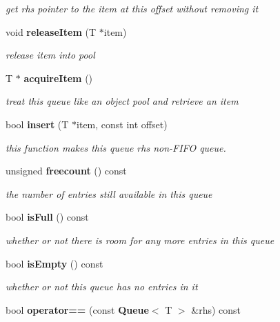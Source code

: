 \begin{CompactItemize}
\begin{CompactList}\small\item\em get rhs pointer to the item at this offset without removing it \item\end{CompactList}\item 
void {\bf releaseItem} (T $\ast$item)
\begin{CompactList}\small\item\em release item into pool \item\end{CompactList}\item 
T $\ast$ {\bf acquireItem} ()
\begin{CompactList}\small\item\em treat this queue like an object pool and retrieve an item \item\end{CompactList}\item 
bool {\bf insert} (T $\ast$item, const int offset)
\begin{CompactList}\small\item\em this function makes this queue rhs non-FIFO queue. \item\end{CompactList}\item 
unsigned {\bf freecount} () const \label{class_d_r_a_msim_i_i_1_1_queue_22574a49b87fd67dda5a0c1cea9235a8}

\begin{CompactList}\small\item\em the number of entries still available in this queue \item\end{CompactList}\item 
bool {\bf isFull} () const \label{class_d_r_a_msim_i_i_1_1_queue_5dd28855c0ff9c2a5b332592948ec0ef}

\begin{CompactList}\small\item\em whether or not there is room for any more entries in this queue \item\end{CompactList}\item 
bool {\bf isEmpty} () const \label{class_d_r_a_msim_i_i_1_1_queue_7a2a856af27f9979d2d20c7e3156eb05}

\begin{CompactList}\small\item\em whether or not this queue has no entries in it \item\end{CompactList}\item 
bool {\bf operator==} (const {\bf Queue}$<$ T $>$ \&rhs) const \label{class_d_r_a_msim_i_i_1_1_queue_5a9c567e37a285618531b6f2a6fb6aa1}


\end{CompactItemize}
